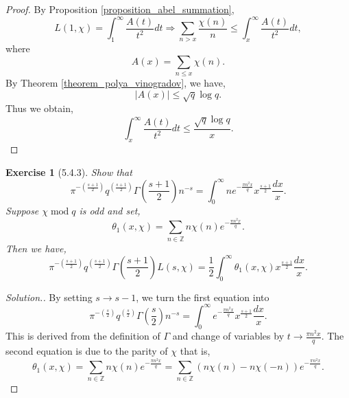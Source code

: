 \documentclass{article}
\newtheorem{exercise}{Exercise}[section]
\DeclareMathOperator{\tmod}{mod}
\newcommand{\Z}[0]{\mathbb{Z}}
\begin{document}
\begin{proof}
  By Proposition \ref{proposition_abel_summation},
  \begin{equation*}
    L(1,\chi) = \int_1^\infty{\frac {A(t)} {t^2}}dt \Rightarrow \sum_{n>x}{\frac {\chi(n)} {n}}\leq \int_x^{\infty}{\frac {A(t)} {t^2}}dt,
  \end{equation*}
  where 
  \begin{equation*}
    A(x) = \sum_{n\leq x}\chi(n).
  \end{equation*}
  By Theorem \ref{theorem_polya_vinogradov}, we have,
  \begin{equation*}
    \vert A(x)\vert\leq \sqrt{q}\log q.
  \end{equation*}
  Thus we obtain,
  \begin{equation*}
    \int_x^{\infty}{\frac {A(t)} {t^2}}dt \leq {\frac {\sqrt{q}\log q} {x}}.
  \end{equation*}
\end{proof}
\begin{exercise}[5.4.3]
  Show that 
  \begin{equation*}
    \pi^{-\left({\frac {s+1} 2}\right)}q^{\left({\frac {s+1} 2}\right)}\Gamma\left({\frac {s+1} 2}\right)n^{-s}=\int_0^\infty ne^{-{\frac{\pi n^2x} q}}x^{{\frac {s+1} 2}}{\frac {dx} x}.
  \end{equation*}
  Suppose $\chi\tmod q$ is odd and set,
  \begin{equation*}
    \theta_1(x,\chi) = \sum_{n\in\Z}n\chi(n)e^{-{\frac{\pi n^2x} q}}.
  \end{equation*}
  Then we have,
  \begin{equation*}
    \pi^{-\left({\frac {s+1} 2}\right)}q^{\left({\frac {s+1} 2}\right)}\Gamma\left({\frac {s+1} 2}\right)L(s,\chi)={\frac 1 2}\int_0^\infty \theta_1(x,\chi)x^{{\frac {s+1} 2}}{\frac {dx} x}.
  \end{equation*}
\end{exercise}
\begin{proof}[Solution.]
  By setting $s\to s-1$, we turn the first equation into
  \begin{equation*}
    \pi^{-\left({\frac {s} 2}\right)}q^{\left({\frac {s} 2}\right)}\Gamma\left({\frac {s} 2}\right)n^{-s}=\int_0^\infty e^{-{\frac{\pi n^2x} q}}x^{{\frac {s+1} 2}}{\frac {dx} x}.
  \end{equation*}
  This is derived from the definition of $\Gamma$ and change of variables by $t\to {\frac {\pi n^2x} q}$.
  The second equation is due to the parity of $\chi$ that is,
  \begin{equation*}
    \theta_1(x,\chi) = \sum_{n\in\Z}n\chi(n)e^{-{\frac{\pi n^2x} q}} = \sum_{n\in\Z}(n\chi(n)-n\chi(-n))e^{-{\frac{\pi n^2x} q}}.
  \end{equation*}
\end{proof}
\end{document}
